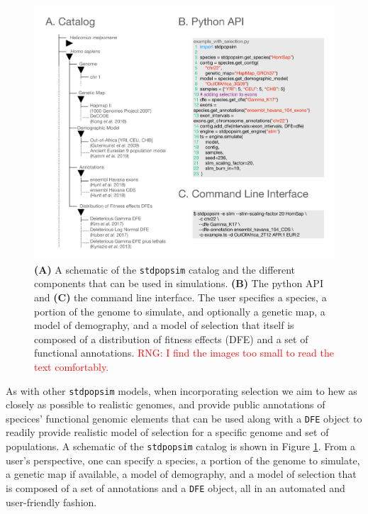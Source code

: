 \documentclass[hidelinks]{article}
\newcommand{\stdpopsim}{\texttt{stdpopsim}\xspace}
\newcommand{\rngcomment}[1]{\textcolor{red}{RNG: #1}}
\begin{document}
    \begin{figure}
        \vspace{-0.0cm}
        \includegraphics[width=\linewidth]{figures/schematics/catalog.pdf}
        \caption{\label{fig:schematic}
        \textbf{(A)} A schematic of the \stdpopsim catalog and the different components that
        can be used in simulations. 
        \textbf{(B)} The python API and \textbf{(C)} the command line interface.
        The user specifies a species, a portion of
        the genome to simulate, and optionally a genetic map, a model of
        demography, and a model of selection that itself is composed of a
        distribution of fitness effects (DFE) and a set of functional
        annotations. \rngcomment{I find the images too small to read the text comfortably.}}
    \end{figure}
    \hfill
    
    As with other \stdpopsim models, when incorporating selection we aim to hew as closely as possible
    to realistic genomes, and provide public annotations of specices' functional genomic
    elements that can be used along with a \texttt{DFE} object to
    readily provide realistic model of selection for a specific genome and set of
    populations. A schematic of the \stdpopsim catalog is shown in Figure \ref{fig:schematic}.
    From a user's perspective, one can specify a species, a portion of the genome to simulate,
    a genetic map if available, a model of demography, and a model of selection that is
    composed of a set of annotations and a \texttt{DFE} object, all in an automated and user-friendly fashion. 
\end{document}
